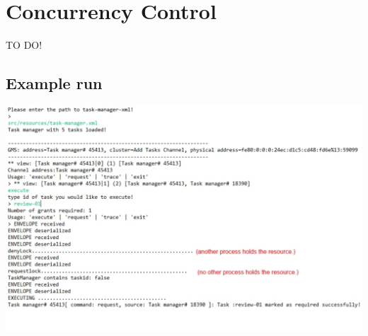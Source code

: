 \chapter{Concurrency Control}


TO DO!


\section{Example run}
\includegraphics[scale=0.6]{images/concurrencyrun.pdf}
